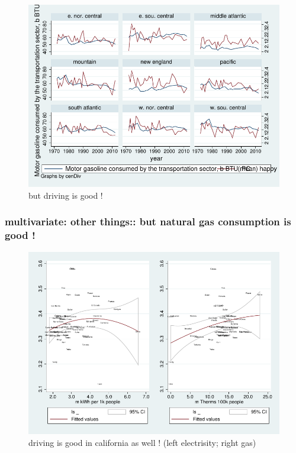 \documentclass[10pt, letterpaper]{article}
\begin{document}
\begin{spacing}{1.4}
\begin{figure}[H]
 \includegraphics[width=6in]{graphsAndTables/cenDivLsYrMGAPB.pdf}\centering
\caption{but driving is good !}\label{cenDivLsYrMGAPB}
 \end{figure}

\subsubsection{multivariate: other things:: but natural gas consumption is good !}

\begin{figure}[H]
 \includegraphics[width=6in]{graphsAndTables/caEleGas.pdf}\centering
\caption{driving is good in california as well ! (left electrisity; right gas)}\label{cenDivLsYrMGAPB}
 \end{figure}


\end{spacing}
\end{document}

